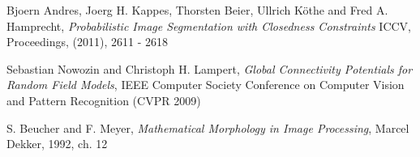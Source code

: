 \begin{thebibliography}{9}
 	Bjoern Andres, Joerg H. Kappes, Thorsten Beier, Ullrich Köthe and Fred A. Hamprecht, 
	\emph{Probabilistic Image Segmentation with Closedness Constraints}
	ICCV, Proceedings, (2011), 2611 - 2618

	Sebastian Nowozin and Christoph H. Lampert, 
	\emph{Global Connectivity Potentials for Random Field Models}, 
	IEEE Computer Society Conference on Computer Vision and Pattern Recognition (CVPR 2009)

 	S. Beucher and F. Meyer,
 	\emph{Mathematical  Morphology  in  Image  Processing}, 
 	Marcel Dekker, 1992, ch. 12


\end{thebibliography}

